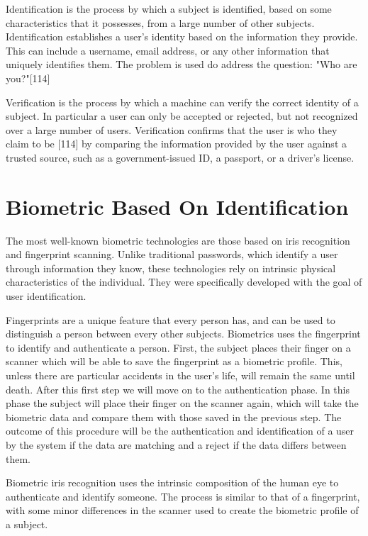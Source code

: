 \documentclass[12pt]{report}
\begin{document}
Identification is the process by which a subject is identified, based on some characteristics that it possesses, from a large number of other subjects.
Identification establishes a user's identity based on the information they provide. 
This can include a username, email address, or any other information that uniquely identifies them.
The problem is used do address the question: "Who are you?"[114]

Verification is the process by which a machine can verify the correct identity of a subject.
In particular a user can only be accepted or rejected, but not recognized over a large number of users.
Verification confirms that the user is who they claim to be [114] by comparing the information provided by the user against a trusted source, such as a government-issued ID, a passport, or a driver's license.


\section{Biometric Based On Identification}

The most well-known biometric technologies are those based on iris recognition and fingerprint scanning. 
Unlike traditional passwords, which identify a user through information they know, these technologies rely on intrinsic physical characteristics of the individual.
They were specifically developed with the goal of user identification.

Fingerprints are a unique feature that every person has, and can be used to distinguish a person between every other subjects. 
Biometrics uses the fingerprint to identify and authenticate a person.
First, the subject places their finger on a scanner which will be able to save the fingerprint as a biometric profile.
This, unless there are particular accidents in the user's life, will remain the same until death.
After this first step we will move on to the authentication phase.
In this phase the subject will place their finger on the scanner again, which will take the biometric data and compare them with those saved in the previous step.
The outcome of this procedure will be the authentication and identification of a user by the system if the data are matching and a reject if the data differs between them.

Biometric iris recognition uses the intrinsic composition of the human eye to authenticate and identify someone.
The process is similar to that of a fingerprint, with some minor differences in the scanner used to create the biometric profile of a subject.
\end{document}

